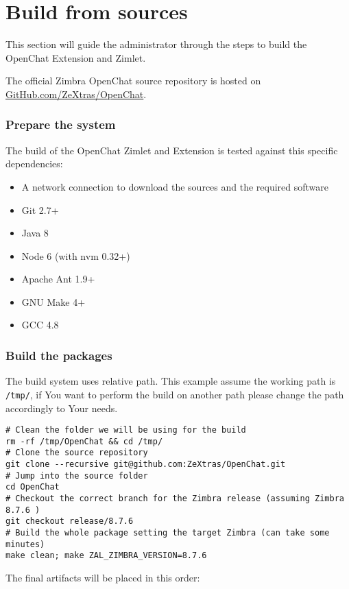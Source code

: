 \section{Build from sources}
\label{==sect:buildfromsrcs==}

This section will guide the administrator through the steps to build the OpenChat Extension and Zimlet.

The official Zimbra OpenChat source repository is hosted on \href{https://www.github.com/ZeXtras/OpenChat}{GitHub.com/ZeXtras/OpenChat}.

\subsubsection{Prepare the system}
    The build of the OpenChat Zimlet and Extension is tested against this specific dependencies:
    \begin{itemize}
        \item A network connection to download the sources and the required software
        \item Git 2.7+
        \item Java 8
        \item Node 6 (with nvm 0.32+)
        \item Apache Ant 1.9+
        \item GNU Make 4+
        \item GCC 4.8
    \end{itemize}

\subsubsection{Build the packages}
    The build system uses relative path.
    This example assume the working path is \verb+/tmp/+, if You want to perform the build on another path please change
    the path accordingly to Your needs.
    \begin{verbatim}
# Clean the folder we will be using for the build
rm -rf /tmp/OpenChat && cd /tmp/
# Clone the source repository
git clone --recursive git@github.com:ZeXtras/OpenChat.git
# Jump into the source folder
cd OpenChat
# Checkout the correct branch for the Zimbra release (assuming Zimbra 8.7.6 )
git checkout release/8.7.6
# Build the whole package setting the target Zimbra (can take some minutes)
make clean; make ZAL_ZIMBRA_VERSION=8.7.6
    \end{verbatim}

    The final artifacts will be placed in this order:


